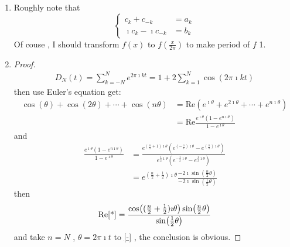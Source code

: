 \solution
\begin{enumerate}
\item {}
Roughly note that 
\begin{equation*}
\begin{cases}
    c_k+c_{-k}&=a_k\\
    \imath c_k-\imath c_{-k}&=b_k
\end{cases}
\end{equation*}
Of couse , I should transform $f(x)$ to $f(\frac{x}{2\pi})$ to make period of $f$ 1.

\item {}
\begin{proof}
\begin{equation*}
\begin{aligned}
    D_N (t)=\sum_{k=-N}^{N}
    e^{2\pi\imath kt}
    =
    1+
    2\sum_{k=1}^{N}
    \cos(2\pi\imath kt)
\end{aligned}        
\end{equation*}
then use Euler's equation get:
\begin{align*}
    \cos(\theta)+\cos(2\theta)
    +\cdots
    +\cos(n\theta)
    &=
    \text{Re}(e^{\imath \theta}+e^{2\imath\theta}+\cdots +e^{n\imath\theta})\\
    &=
    \text{Re}
    \frac{
        e^{\imath\theta}
        (1-e^{n\imath \theta})
    }
    {1-e^{\imath\theta}}\tag{-}
\label{-}
\end{align*}
and 
\begin{align*}
    \frac{e^{\imath\theta}(1-e^{n\imath\theta})}
    {1-e^{\imath\theta}}
    &=
    \frac{
        e^{(\frac{n}{2}+1)\imath \theta}
        (
        e^{(-\frac{n}{2})\imath \theta}
        -
        e^{(\frac{n}{2})\imath \theta}
        )
    }
    {e^{\frac{1}{2}\imath\theta}(e^{-\frac{1}{2}\imath\theta}-e^{\frac{1}{2}\imath\theta})}
    \\
    &=
    e^{(\frac{n}{2}+\frac{1}{2})\imath\theta}
    \frac{-2\imath\sin(\frac{n}{2}\theta)}
    {-2\imath\sin(\frac{1}{2}\theta)}\tag{*}\label{*}
\end{align*}
then 
$$
\text{Re}\ref{*}
=\frac{\cos((\frac{n}{2}+\frac{1}{2})\imath \theta)\sin(\frac{n}{2}\theta)}{\sin(\frac{1}{2}\theta)}
$$
and take $n=N$ , $\theta=2\pi\imath t$ to \ref{-} , the conclusion is obvious.
\end{proof}
\end{enumerate}